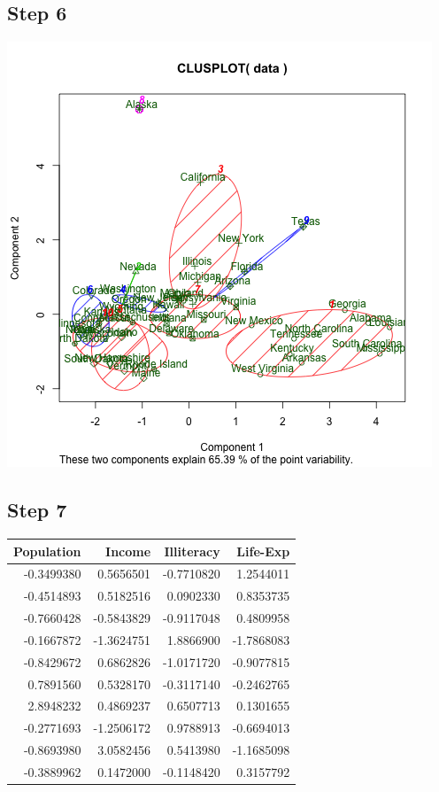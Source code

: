 \documentclass[11pt]{article}
\begin{document}
\subsection*{Step 6}
\label{sec:org978daa7}
\begin{center}
\includegraphics[width=.9\linewidth]{kmeans-10.png}
\end{center}
\subsection*{Step 7}
\label{sec:org90c3b28}

\begin{center}
\begin{tabular}{rrrr}
Population & Income & Illiteracy & Life-Exp\\
\hline
-0.3499380 & 0.5656501 & -0.7710820 & 1.2544011\\
-0.4514893 & 0.5182516 & 0.0902330 & 0.8353735\\
-0.7660428 & -0.5843829 & -0.9117048 & 0.4809958\\
-0.1667872 & -1.3624751 & 1.8866900 & -1.7868083\\
-0.8429672 & 0.6862826 & -1.0171720 & -0.9077815\\
0.7891560 & 0.5328170 & -0.3117140 & -0.2462765\\
2.8948232 & 0.4869237 & 0.6507713 & 0.1301655\\
-0.2771693 & -1.2506172 & 0.9788913 & -0.6694013\\
-0.8693980 & 3.0582456 & 0.5413980 & -1.1685098\\
-0.3889962 & 0.1472000 & -0.1148420 & 0.3157792\\
\end{tabular}
\end{center}
\end{document}
